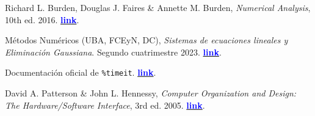 \begin{thebibliography}{999}
\label{sec:referencias}

    Richard L. Burden, Douglas J. Faires \& Annette M. Burden,
    \emph{Numerical Analysis}, 10th ed.
    2016. \href{https://heavyphysicsblog.files.wordpress.com/2019/06/analisis-numerico-burden-faires-10ed.pdf}{\textbf{\textcolor{blue}{link}}}.

    Métodos Numéricos (UBA, FCEyN, DC),
    \emph{Sistemas de ecuaciones lineales y Eliminación Gaussiana}.
    Segundo cuatrimestre 2023. \href{https://heavyphysicsblog.files.wordpress.com/2019/06/analisis-numerico-burden-faires-10ed.pdf}{\textbf{\textcolor{blue}{link}}}.

    Documentación oficial de \texttt{\%timeit}. \href{https://ipython.readthedocs.io/en/stable/interactive/magics.html#magic-timeit}{\textbf{\textcolor{blue}{link}}}.

    David A. Patterson \& John L. Hennessy,
    \emph{Computer Organization and Design: The Hardware/Software Interface}, 3rd ed.
    2005. \href{https://ia600201.us.archive.org/24/items/ComputerOrganizationAndDesign3rdEdition/-computer%20organization%20and%20design%203rd%20edition.pdf}{\textbf{\textcolor{blue}{link}}}.

\end{thebibliography}